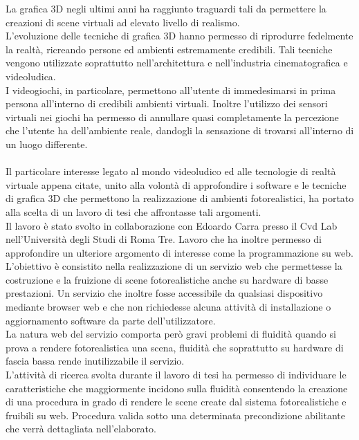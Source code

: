 La grafica 3D negli ultimi anni ha raggiunto traguardi tali da permettere la creazioni di scene virtuali ad elevato livello di realismo.
\\
L’evoluzione delle tecniche di grafica 3D hanno permesso di riprodurre fedelmente la realtà, ricreando persone ed ambienti estremamente credibili. Tali tecniche vengono utilizzate soprattutto nell’architettura e nell’industria cinematografica e videoludica.
\\
I videogiochi, in particolare, permettono all’utente di immedesimarsi in prima persona all’interno di credibili ambienti virtuali. Inoltre l’utilizzo dei sensori virtuali nei giochi ha permesso di annullare quasi completamente la percezione che l’utente ha dell’ambiente reale, dandogli la sensazione di trovarsi all’interno di un luogo differente.
\\
\\
Il particolare interesse legato al mondo videoludico ed alle tecnologie di realtà virtuale appena citate, unito alla volontà di approfondire i software e le tecniche di grafica 3D che permettono la realizzazione di ambienti fotorealistici, ha portato alla scelta di un lavoro di tesi che affrontasse tali argomenti.
\\
Il lavoro è stato svolto in collaborazione con Edoardo Carra presso il Cvd Lab nell’Università degli Studi di Roma Tre. Lavoro che ha inoltre permesso di approfondire un ulteriore argomento di interesse come la programmazione su web.
\\
L’obiettivo è consistito nella realizzazione di un servizio web che permettesse la costruzione e la fruizione di scene fotorealistiche anche su hardware di basse prestazioni.
Un servizio che inoltre fosse accessibile da qualsiasi dispositivo mediante browser web e che non richiedesse alcuna attività di installazione o aggiornamento software da parte dell’utilizzatore.
\\
La natura web del servizio comporta però gravi problemi di fluidità quando si prova a rendere fotorealistica una scena, fluidità che soprattutto su hardware di fascia bassa rende inutilizzabile il servizio.
\\
L’attività di ricerca svolta durante il lavoro di tesi ha permesso di individuare le caratteristiche che maggiormente incidono sulla fluidità consentendo la creazione di una procedura in grado di rendere le scene create dal sistema fotorealistiche e fruibili su web.
Procedura valida sotto una determinata precondizione abilitante che verrà dettagliata nell’elaborato.
\\
